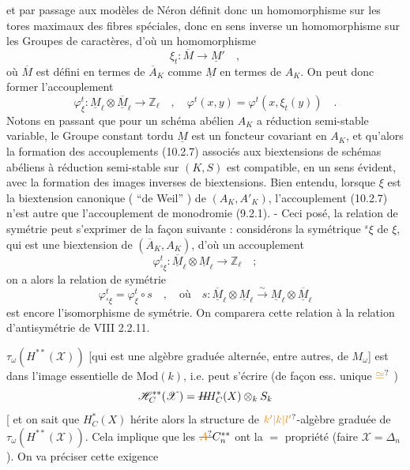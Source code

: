 et par passage aux modèles de Néron définit donc un homomorphisme sur les tores maximaux des fibres spéciales, donc en sens inverse un homomorphisme sur les Groupes de caractères, d'où un homomorphisme
\[
 \xi_t:\overline M\longrightarrow\underline M'\quad,\tag*{(10.2.6)}
\]
où $\overline M$ est défini en termes de $\overline A_K$ comme $\underline M$ en termes de $A_K$. On peut donc former l'accouplement
\[
 \varphi^t_\xi:\underline M_\ell\otimes\underline{\overline M}_\ell\longrightarrow\mathbb Z_\ell
 \quad,\quad\varphi^t(x,y)=\varphi^t(x,\xi_t(y))\quad.\tag*{(10.2.7)}
\]
Notons en passant que pour un schéma abélien $A_K$ a réduction semi-stable variable, le Groupe constant tordu $\underline M$ est un foncteur covariant en $A_K$, et qu'alors la formation des accouplements (10.2.7) associés aux biextensions de schémas abéliens à réduction semi-stable sur $(K,S)$ est compatible, en un sens évident, avec la formation des images inverses de biextensions. Bien entendu, lorsque $\xi$ est la biextension canonique ( ``de Weil'' ) de $(A_K,A'_K)$, l'accouplement (10.2.7) n'est autre que l'accouplement de monodromie (9.2.1). - Ceci posé, la relation de symétrie peut s'exprimer de la façon suivante : considérons la symétrique $ {}^s\xi$ de $\xi$, qui est une biextension de $(\overline A_K,A_K)$, d'où un accouplement
\[
 \varphi^t_{{}^s\xi}:\underline{\overline M}_\ell\otimes\underline M_\ell\longrightarrow\mathbb Z_\ell\quad;
\]
on a alors la relation de symétrie
\[
 \varphi^t_{{}^s\xi}=\varphi^t_\xi\circ s\quad,\quad\text{où}\quad
 s:\underline{\overline M}_\ell\otimes\underline M_\ell\xrightarrow{\sim}\underline M_\ell\otimes\underline{\overline M}_\ell
 \tag*{(10.2.8)}
\]
est encore l'isomorphisme de symétrie. On comparera cette relation à la relation d'antisymétrie de VIII 2.2.11.

$\tau_\omega(H^{**}(\mathscr X))$ [qui est une algèbre graduée  alternée, entre autres, de $M_\omega$] est  dans l'image essentielle de $\mathrm{Mod}(k)$, i.e. peut s'écrire (de façon ess. unique  $\unsure{\cong}$ )
\[
 \mathscr H_C^{**}(\mathscr X)=\deleted{H}\!H_C^*(X)\otimes_k S_k
\]
[ et on sait que $H_C^*(X)$ hérite alors la structure de $\unsure{k'|k|l'}$-algèbre graduée de $\tau_\omega(H^{**}(\mathscr X))$. Cela implique que  les $\deleted{\unsure{A}}C_n^{**}$ ont la $=$ propriété (faire $\mathscr X=\Delta_n$).
 On va préciser cette exigence

